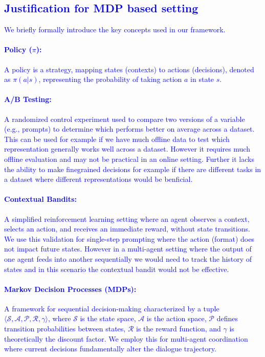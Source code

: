 \subsection{\textcolor{blue}{Justification for MDP based setting}}
\label{sec:mdp_justification}

\textcolor{blue}{
We briefly formally introduce the key concepts used in our framework. }

\textcolor{blue}{
\paragraph{Policy ($\pi$):} A policy is a strategy, mapping states (contexts) to actions (decisions), denoted as $\pi(a|s)$, representing the probability of taking action $a$ in state $s$.
\paragraph{A/B Testing:} A randomized control experiment used to compare two versions of a variable (e.g., prompts) to determine which performs better on average across a dataset. This can be used for example if we have much offline data to test which representation generally works well across a dataset. However it requires much offline evaluation and may not be practical in an online setting. Further it lacks the ability to make finegrained decisions for example if there are different tasks in a dataset where different representations would be benficial. 
\paragraph{Contextual Bandits:} A simplified reinforcement learning setting where an agent observes a context, selects an action, and receives an immediate reward, without state transitions. We use this validation for single-step prompting where the action (format) does not impact future states. However in a multi-agent setting where the output of one agent feeds into another sequentially we would need to track the history of states and in this scenario the contextual bandit would not be effective.
\paragraph{Markov Decision Processes (MDPs):} A framework for sequential decision-making characterized by a tuple $\langle \mathcal{S}, \mathcal{A}, \mathcal{P}, \mathcal{R}, \gamma \rangle$, where $\mathcal{S}$ is the state space, $\mathcal{A}$ is the action space, $\mathcal{P}$ defines transition probabilities between states, $\mathcal{R}$ is the reward function, and $\gamma$ is theoretically the discount factor. We employ this for multi-agent coordination where current decisions fundamentally alter the dialogue trajectory.
}
